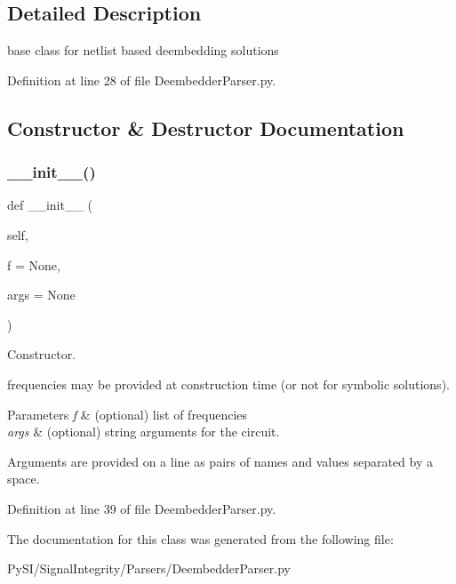 \subsection{Detailed Description}
base class for netlist based deembedding solutions 

Definition at line 28 of file Deembedder\+Parser.\+py.



\subsection{Constructor \& Destructor Documentation}
\mbox{\label{classSignalIntegrity_1_1Parsers_1_1DeembedderParser_1_1DeembedderParser_af9856388f7022892c3159ad55872a27e}} 
\subsubsection{\texorpdfstring{\+\_\+\+\_\+init\+\_\+\+\_\+()}{\_\_init\_\_()}}
{\footnotesize\ttfamily def \+\_\+\+\_\+init\+\_\+\+\_\+ (\begin{DoxyParamCaption}\item[{}]{self,  }\item[{}]{f = {\ttfamily None},  }\item[{}]{args = {\ttfamily None} }\end{DoxyParamCaption})}



Constructor. 

frequencies may be provided at construction time (or not for symbolic solutions).


\begin{DoxyParams}{Parameters}
{\em f} & (optional) list of frequencies \\
\hline
{\em args} & (optional) string arguments for the circuit.\\
\hline
\end{DoxyParams}
Arguments are provided on a line as pairs of names and values separated by a space. 

Definition at line 39 of file Deembedder\+Parser.\+py.



The documentation for this class was generated from the following file\+:\begin{DoxyCompactItemize}
\item 
Py\+S\+I/\+Signal\+Integrity/\+Parsers/Deembedder\+Parser.\+py\end{DoxyCompactItemize}
